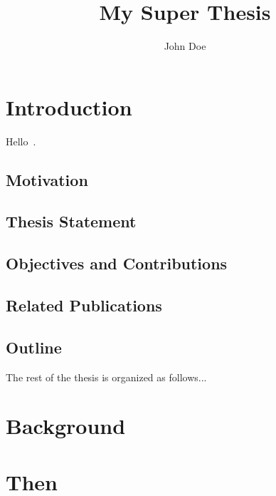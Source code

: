 \documentclass[letterpaper,12pt,onecolumn,final]{report}
\author{John Doe}
\title{My Super Thesis}
\begin{document}
\begin{abstract}
{%
\blindtext[1]

\blindtext[1]

\blindtext[1]

\blindtext[1]
}
\end{abstract}

\begin{acknowledgments}
	\blindtext[2]
\end{acknowledgments}


\chapter{Introduction}

Hello~\cite{cold-boot-attack}.

\section{Motivation}
\blindtext[5]

\section{Thesis Statement}
\blindtext[2]

\section{Objectives and Contributions}
\blindtext[3]

\section{Related Publications}
\blindtext[1]

\section{Outline}
The rest of the thesis is organized as follows...


\chapter{Background}
\label{chap:background}
\blindtext[10]


\chapter{Then}
\end{document}
